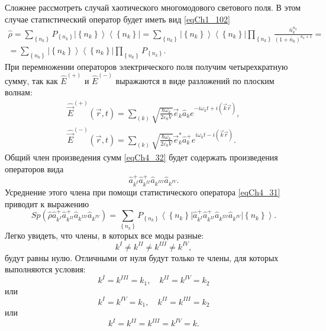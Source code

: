 Сложнее рассмотреть случай хаотического многомодового светового
поля. В этом случае статистический оператор будет иметь вид
\eqref{eqCh1_102} 
\begin{eqnarray}
\hat{\rho} = \sum_{\left\{n_k\right\}} P_{\left\{n_k\right\}} \left|\left\{n_k\right\}\right>\left<\left\{n_k\right\}\right| = 
\sum_{\left\{n_k\right\}} 
 \left|\left\{n_k\right\}\right>\left<\left\{n_k\right\}\right|
\prod_{\left\{n_k\right\}} 
\frac{\bar{n}_k^{n_k}}{\left(1 + \bar{n}_k\right)^{n_k+1}} = 
\nonumber \\
= 
\sum_{\left\{n_k\right\}} 
 \left|\left\{n_k\right\}\right>\left<\left\{n_k\right\}\right|
\prod_{\left\{n_k\right\}} P_{\left\{n_k\right\}}.
\label{eqCh4_31}
\end{eqnarray}
При перемножении операторов электрического поля получим четырехкратную
сумму, так как $\hat{E}^{(+)}$ и $\hat{E}^{(-)}$ выражаются в виде
разложений по плоским волнам: 
\begin{eqnarray}
\hat{\vec{E}}^{(+)}\left(\vec{r}, t\right) = \sum_{(k)}
\sqrt{\frac{\hbar \omega_k}{2 \varepsilon_0 V}} \vec{e}_k \hat{a}_k
e^{-i \omega_k t + i \left(\vec{k} \vec{r}\right)},
\nonumber \\
\hat{\vec{E}}^{(-)}\left(\vec{r}, t\right) = \sum_{(k)}
\sqrt{\frac{\hbar \omega_k}{2 \varepsilon_0 V}} \vec{e}_k^{*} \hat{a}_k^{+}
e^{i \omega_k t - i \left(\vec{k} \vec{r}\right)}.
\label{eqCh4_32}
\end{eqnarray}
Общий член произведения сумм \eqref{eqCh4_32} будет содержать
произведения операторов вида 
\begin{equation}
\hat{a}^{+}_{k^{I}}\hat{a}^{+}_{k^{II}}\hat{a}_{k^{III}}\hat{a}_{k^{IV}}.
\label{eqCh4_33}
\end{equation}
Усреднение этого члена при помощи статистического оператора
\eqref{eqCh4_31} приводит к выражению 
\[
Sp\left(\hat{\rho}
\hat{a}^{+}_{k^{I}}\hat{a}^{+}_{k^{II}}\hat{a}_{k^{III}}\hat{a}_{k^{IV}}
\right) = 
\sum_{\left\{n_k\right\}} P_{\left\{n_k\right\}}
\left<\left\{n_k\right\}\right|
\hat{a}^{+}_{k^{I}}\hat{a}^{+}_{k^{II}}\hat{a}_{k^{III}}\hat{a}_{k^{IV}}
\left|\left\{n_k\right\}\right>.
\]
Легко увидеть, что члены, в которых все моды разные: 
\[
k^{I} \neq k^{II} \neq k^{III} \neq k^{IV},
\]
будут равны нулю. Отличными от нуля будут только те члены, для которых
выполняются условия:
\[
k^{I} = k^{III} = k_1, \quad k^{II} = k^{IV} = k_2
\]
или
\[
k^{I} = k^{IV} = k_1, \quad k^{II} = k^{III} = k_2
\]
или
\[
k^{I} = k^{II} =  k^{III} = k^{IV} = k.
\]   


